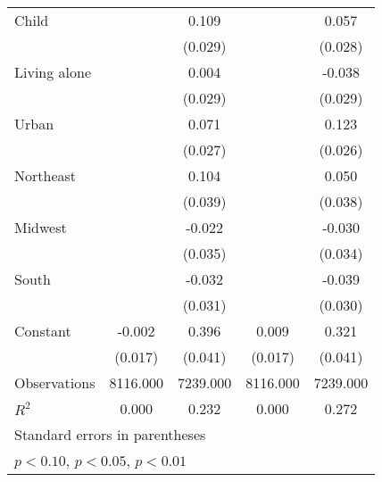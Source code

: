 {\begin{tabular}{l*{4}{c}}
\addlinespace
Child               &                     &       0.109\sym{***}&                     &       0.057\sym{**} \\
                    &                     &     (0.029)         &                     &     (0.028)         \\
\addlinespace
Living alone        &                     &       0.004         &                     &      -0.038         \\
                    &                     &     (0.029)         &                     &     (0.029)         \\
\addlinespace
Urban               &                     &       0.071\sym{***}&                     &       0.123\sym{***}\\
                    &                     &     (0.027)         &                     &     (0.026)         \\
\addlinespace
Northeast           &                     &       0.104\sym{***}&                     &       0.050         \\
                    &                     &     (0.039)         &                     &     (0.038)         \\
\addlinespace
Midwest             &                     &      -0.022         &                     &      -0.030         \\
                    &                     &     (0.035)         &                     &     (0.034)         \\
\addlinespace
South               &                     &      -0.032         &                     &      -0.039         \\
                    &                     &     (0.031)         &                     &     (0.030)         \\
\addlinespace
Constant            &      -0.002         &       0.396\sym{***}&       0.009         &       0.321\sym{***}\\
                    &     (0.017)         &     (0.041)         &     (0.017)         &     (0.041)         \\
\midrule
Observations        &    8116.000         &    7239.000         &    8116.000         &    7239.000         \\
\(R^{2}\)           &       0.000         &       0.232         &       0.000         &       0.272         \\
\bottomrule
\multicolumn{5}{l}{\footnotesize Standard errors in parentheses}\\
\multicolumn{5}{l}{\footnotesize \sym{*} \(p<0.10\), \sym{**} \(p<0.05\), \sym{***} \(p<0.01\)}\\
\end{tabular}
}
